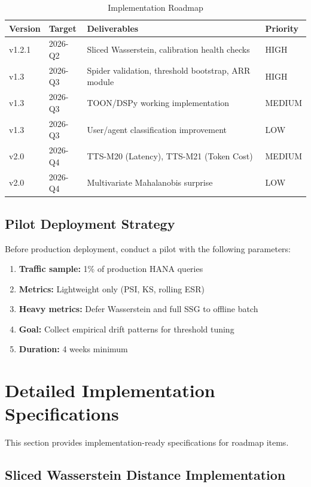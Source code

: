 \begin{table}[htbp]
\centering
\footnotesize
\caption{Implementation Roadmap}
\label{tab:roadmap}
\begin{tabularx}{\textwidth}{@{}l l X l@{}}
\toprule
\textbf{Version} & \textbf{Target} & \textbf{Deliverables} & \textbf{Priority} \\
\midrule
v1.2.1 & 2026-Q2 & Sliced Wasserstein, calibration health checks & HIGH \\
v1.3 & 2026-Q3 & Spider validation, threshold bootstrap, ARR module & HIGH \\
v1.3 & 2026-Q3 & TOON/DSPy working implementation & MEDIUM \\
v1.3 & 2026-Q3 & User/agent classification improvement & LOW \\
v2.0 & 2026-Q4 & TTS-M20 (Latency), TTS-M21 (Token Cost) & MEDIUM \\
v2.0 & 2026-Q4 & Multivariate Mahalanobis surprise & LOW \\
\bottomrule
\end{tabularx}
\end{table}

\subsection{Pilot Deployment Strategy}

Before production deployment, conduct a pilot with the following parameters:

\begin{enumerate}
  \item \textbf{Traffic sample:} 1\% of production HANA queries
  \item \textbf{Metrics:} Lightweight only (PSI, KS, rolling ESR)
  \item \textbf{Heavy metrics:} Defer Wasserstein and full SSG to offline batch
  \item \textbf{Goal:} Collect empirical drift patterns for threshold tuning
  \item \textbf{Duration:} 4 weeks minimum
\end{enumerate}

\section{Detailed Implementation Specifications}

This section provides implementation-ready specifications for roadmap items.

\subsection{Sliced Wasserstein Distance Implementation}
\label{sec:sliced-wasserstein-impl}

